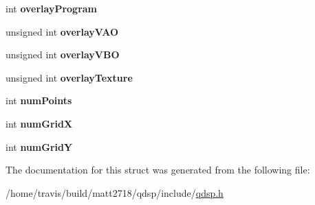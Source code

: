 \begin{DoxyCompactItemize}
\item 
\hypertarget{structQDSPplot_a6257814abe5efb9ee52cd6658b1ce933}{int {\bfseries overlay\-Program}}\label{structQDSPplot_a6257814abe5efb9ee52cd6658b1ce933}

\item 
\hypertarget{structQDSPplot_a92cf8cbae7908fddb7a63dc2596f6b59}{unsigned int {\bfseries overlay\-V\-A\-O}}\label{structQDSPplot_a92cf8cbae7908fddb7a63dc2596f6b59}

\item 
\hypertarget{structQDSPplot_a7833b6468051a8d75b665bd503a5af81}{unsigned int {\bfseries overlay\-V\-B\-O}}\label{structQDSPplot_a7833b6468051a8d75b665bd503a5af81}

\item 
\hypertarget{structQDSPplot_a531273096679513ebe462c8c8a624a5f}{unsigned int {\bfseries overlay\-Texture}}\label{structQDSPplot_a531273096679513ebe462c8c8a624a5f}

\item 
\hypertarget{structQDSPplot_a1256342bb295325ca2033ea039fb0ace}{int {\bfseries num\-Points}}\label{structQDSPplot_a1256342bb295325ca2033ea039fb0ace}

\item 
\hypertarget{structQDSPplot_a3d90435a4123b9474eba0f4bc26c64fa}{int {\bfseries num\-Grid\-X}}\label{structQDSPplot_a3d90435a4123b9474eba0f4bc26c64fa}

\item 
\hypertarget{structQDSPplot_af535b086ef51afa3942ca9086f3f31ac}{int {\bfseries num\-Grid\-Y}}\label{structQDSPplot_af535b086ef51afa3942ca9086f3f31ac}

\end{DoxyCompactItemize}


The documentation for this struct was generated from the following file\-:\begin{DoxyCompactItemize}
\item 
/home/travis/build/matt2718/qdsp/include/\hyperlink{qdsp_8h}{qdsp.\-h}\end{DoxyCompactItemize}
